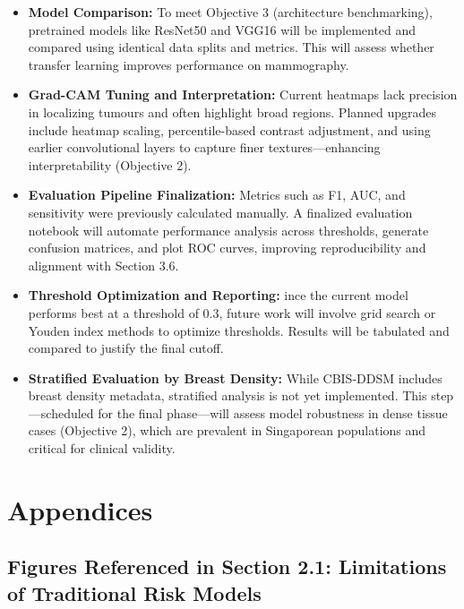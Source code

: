 \documentclass[12pt]{article}
\begin{document}
\begin{itemize}
    \item \textbf{Model Comparison:} To meet Objective 3 (architecture benchmarking), pretrained models like ResNet50 and VGG16 will be implemented and compared using identical data splits and metrics. This will assess whether transfer learning improves performance on mammography.

    \item \textbf{Grad-CAM Tuning and Interpretation:} Current heatmaps lack precision in localizing tumours and often highlight broad regions. Planned upgrades include heatmap scaling, percentile-based contrast adjustment, and using earlier convolutional layers to capture finer textures—enhancing interpretability (Objective 2).

    \item \textbf{Evaluation Pipeline Finalization:} Metrics such as F1, AUC, and sensitivity were previously calculated manually. A finalized evaluation notebook will automate performance analysis across thresholds, generate confusion matrices, and plot ROC curves, improving reproducibility and alignment with Section 3.6.

    \item \textbf{Threshold Optimization and Reporting:} ince the current model performs best at a threshold of 0.3, future work will involve grid search or Youden index methods to optimize thresholds. Results will be tabulated and compared to justify the final cutoff.
    
    \item \textbf{Stratified Evaluation by Breast Density:} 
    While CBIS-DDSM includes breast density metadata, stratified analysis is not yet implemented. This step—scheduled for the final phase—will assess model robustness in dense tissue cases (Objective 2), which are prevalent in Singaporean populations and critical for clinical validity.
\end{itemize}





\newpage
\section{Appendices}

\subsection{Figures Referenced in Section 2.1: Limitations of Traditional Risk Models}
\end{document}
